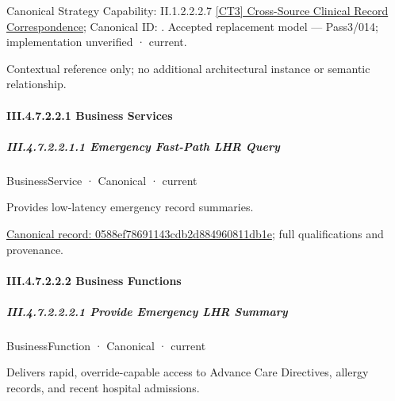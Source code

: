 {\small Canonical Strategy Capability: II.1.2.2.2.7 \hyperref[element:08c8d56f6a1c45b4919e9579b3f695a0]{[CT3] Cross-Source Clinical Record Correspondence}; Canonical ID: \texttt{}. Accepted replacement model — Pass3/014; implementation unverified · current.}\par
Contextual reference only; no additional architectural instance or semantic relationship.\par
\paragraph*{III.4.7.2.2.1 Business Services}
\label{navigation:III.4.7.2.2.1}

\subparagraph*{III.4.7.2.2.1.1 Emergency Fast-Path LHR Query}
\label{navigation:III.4.7.2.2.1.1}

\label{element:0588ef78691143cdb2d884960811db1e}
{\small BusinessService · Canonical · current}\par

Provides low-latency emergency record summaries.


{\footnotesize \href{../../../../../../../continuum/business/business-service/0588ef78691143cdb2d884960811db1e.md}{Canonical record: 0588ef78691143cdb2d884960811db1e}; full qualifications and provenance.}\par
\paragraph*{III.4.7.2.2.2 Business Functions}
\label{navigation:III.4.7.2.2.2}

\subparagraph*{III.4.7.2.2.2.1 Provide Emergency LHR Summary}
\label{navigation:III.4.7.2.2.2.1}

\label{element:a7235e8b249a4914b951e0d795132316}
{\small BusinessFunction · Canonical · current}\par

Delivers rapid, override-capable access to Advance Care Directives, allergy records, and recent hospital admissions.


